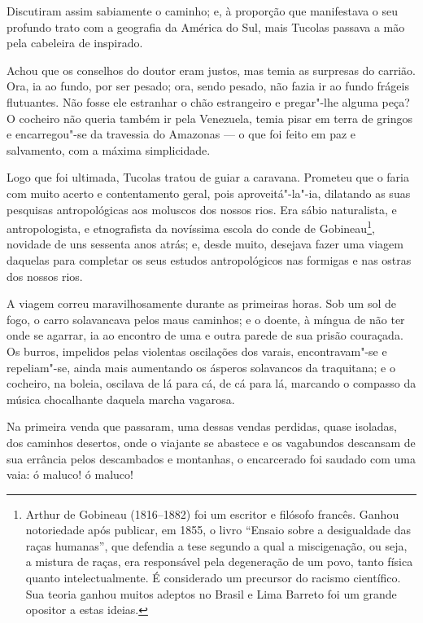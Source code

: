 Discutiram assim sabiamente o caminho; e, à proporção que manifestava o
seu profundo trato com a geografia da América do Sul, mais Tucolas
passava a mão pela cabeleira de inspirado.

Achou que os conselhos do doutor eram justos, mas temia as surpresas do
carrião. Ora, ia ao fundo, por ser pesado; ora, sendo pesado, não fazia
ir ao fundo frágeis flutuantes. Não fosse ele estranhar o chão
estrangeiro e pregar"-lhe alguma peça? O cocheiro não queria também ir
pela Venezuela, temia pisar em terra de gringos e encarregou"-se da
travessia do Amazonas --- o que foi feito em paz e salvamento, com a
máxima simplicidade.

Logo que foi ultimada, Tucolas tratou de guiar a caravana. Prometeu que
o faria com muito acerto e contentamento geral, pois aproveitá"-la"-ia,
dilatando as suas pesquisas antropológicas aos moluscos dos nossos rios.
Era sábio naturalista, e antropologista, e etnografista da novíssima
escola do conde de Gobineau\footnote{Arthur de Gobineau (1816--1882)
  foi um escritor e filósofo francês. Ganhou notoriedade após publicar,
  em 1855, o livro ``Ensaio sobre a desigualdade das raças humanas'',
  que defendia a tese segundo a qual a miscigenação, ou seja, a mistura
  de raças, era responsável pela degeneração de um povo, tanto física
  quanto intelectualmente. É considerado um precursor do racismo
  científico. Sua teoria ganhou muitos adeptos no Brasil e Lima Barreto
  foi um grande opositor a estas ideias.}, novidade de uns sessenta anos
atrás; e, desde muito, desejava fazer uma viagem daquelas para completar
os seus estudos antropológicos nas formigas e nas ostras dos nossos
rios.

A viagem correu maravilhosamente durante as primeiras horas. Sob um sol
de fogo, o carro solavancava pelos maus caminhos; e o doente, à míngua
de não ter onde se agarrar, ia ao encontro de uma e outra parede de sua
prisão couraçada. Os burros, impelidos pelas violentas oscilações dos
varais, encontravam"-se e repeliam"-se, ainda mais aumentando os ásperos
solavancos da traquitana; e o cocheiro, na boleia, oscilava de lá para
cá, de cá para lá, marcando o compasso da música chocalhante daquela
marcha vagarosa.

Na primeira venda que passaram, uma dessas vendas perdidas, quase
isoladas, dos caminhos desertos, onde o viajante se abastece e os
vagabundos descansam de sua errância pelos descambados e montanhas, o
encarcerado foi saudado com uma vaia: ó maluco! ó maluco!

